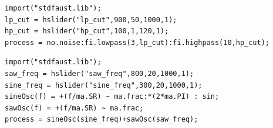 \documentclass[lettersize,journal]{IEEEtran}
\newcommand{\BPNoise}{\textbf{BP-Noise}}
\newcommand{\AddSineSaw}{\textbf{Add-SineSaw}}
\newcommand{\AmpMod}{\textbf{Noise-AM}}
\newcommand{\FMMod}{\textbf{SineSaw-AM}}
\providecommand{\DIFdelend}{} %
\DeclareRobustCommand{\DIFdelend}{\DIFOaddend \let\includegraphics\DIFOincludegraphics} %
\begin{document}

\DIFdelend \begin{lstlisting}[caption={\BPNoise}, label={lst:program0}, language=Faust,
                  float, floatplacement=!H, xleftmargin=1em, xrightmargin=0.5em, firstnumber=0, aboveskip=0em, belowskip=-1em]
import("stdfaust.lib");
lp_cut = hslider("lp_cut",900,50,1000,1);
hp_cut = hslider("hp_cut",100,1,120,1);
process = no.noise:fi.lowpass(3,lp_cut):fi.highpass(10,hp_cut);
\end{lstlisting}

\begin{lstlisting}[caption={\AddSineSaw}, label={lst:program1},language=Faust,float,floatplacement=!H,xleftmargin=1em,xrightmargin=0.5em,firstnumber=0,aboveskip=0em, belowskip=-1em]
import("stdfaust.lib");
saw_freq = hslider("saw_freq",800,20,1000,1);
sine_freq = hslider("sine_freq",300,20,1000,1);
sineOsc(f) = +(f/ma.SR) ~ ma.frac:*(2*ma.PI) : sin;
sawOsc(f) = +(f/ma.SR) ~ ma.frac;
process = sineOsc(sine_freq)+sawOsc(saw_freq);
\end{lstlisting}
\end{document}
